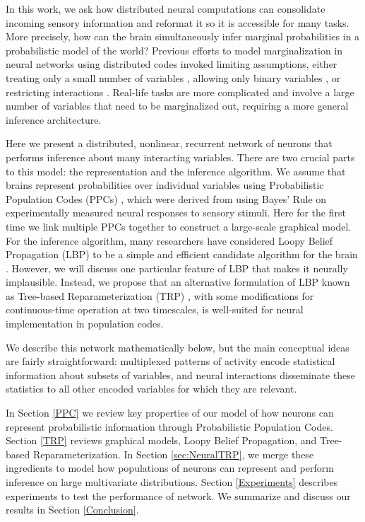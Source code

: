 \documentclass{article}
\begin{document}
In this work, we ask how distributed neural computations can consolidate incoming sensory information and reformat it so it is accessible for many tasks. More precisely, how can the brain simultaneously infer marginal probabilities in a probabilistic model of the world? Previous efforts to model marginalization in neural networks using distributed codes invoked limiting assumptions, either treating only a small number of variables \cite{beck2011marginalization}, allowing only binary variables \cite{ott2006neurodynamics,steimer2009belief,litvak2009cortical}, or restricting interactions \cite{george2009towards,grabska2013demixing}. Real-life tasks are more complicated and involve a large number of variables that need to be marginalized out, requiring a more general inference architecture.

Here we present a distributed, nonlinear, recurrent network of neurons that performs inference about many interacting variables. There are two crucial parts to this model: the representation and the inference algorithm. We assume that brains represent probabilities over individual variables using Probabilistic Population Codes (PPCs) \cite{ma2006bayesian}, which were derived from using Bayes' Rule on experimentally measured neural responses to sensory stimuli. Here for the first time we link multiple PPCs together to construct a large-scale graphical model. For the inference algorithm, many researchers have considered Loopy Belief Propagation (LBP) to be a simple and efficient candidate algorithm for the brain \cite{pearl1988probabilistic,yedidia2003understanding,lee2003hierarchical,rao2004hierarchical,george2009towards,ott2006neurodynamics,litvak2009cortical,steimer2009belief}. However, we will discuss one particular feature of LBP that makes it neurally implausible. Instead, we propose that an alternative formulation of LBP known as Tree-based Reparameterization (TRP) \cite{wainwright2003tree}, with some modifications for continuous-time operation at two timescales, is well-suited for neural implementation in population codes.

We describe this network mathematically below, but the main conceptual ideas are fairly straightforward: multiplexed patterns of activity encode statistical information about subsets of variables, and neural interactions disseminate these statistics to all other encoded variables for which they are relevant.

In Section \ref{PPC} we review key properties of our model of how neurons can represent probabilistic information through Probabilistic Population Codes. Section \ref{TRP} reviews graphical models, Loopy Belief Propagation, and Tree-based Reparameterization. In Section \ref{sec:NeuralTRP}, we merge these ingredients to model how populations of neurons can represent and perform inference on large multivariate distributions. Section \ref{Experiments} describes experiments to test the performance of network. We summarize and discuss our results in Section \ref{Conclusion}.
\end{document}
